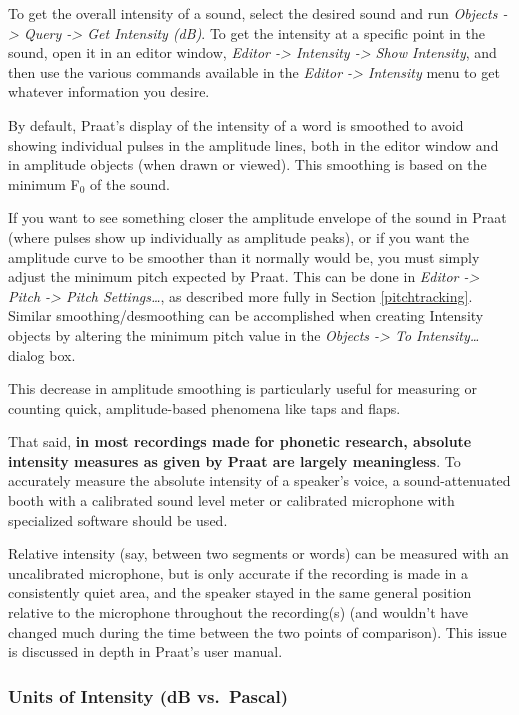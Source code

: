 \documentclass[11pt]{article}
\begin{document}
To get the overall intensity of a sound, select the desired sound and
run \emph{Objects -\textgreater{} Query -\textgreater{} Get Intensity
(dB)}. To get the intensity at a specific point in the sound, open it in
an editor window, \emph{Editor -\textgreater{} Intensity -\textgreater{}
Show Intensity}, and then use the various commands available in the
\emph{Editor -\textgreater{} Intensity} menu to get whatever information
you desire.

By default, Praat's display of the intensity of a word is smoothed to
avoid showing individual pulses in the amplitude lines, both in the
editor window and in amplitude objects (when drawn or viewed). This
smoothing is based on the minimum F$_{0}$ of the sound.

If you want to see something closer the amplitude envelope of the sound
in Praat (where pulses show up individually as amplitude peaks), or if
you want the amplitude curve to be smoother than it normally would be,
you must simply adjust the minimum pitch expected by Praat. This can be
done in \emph{Editor -\textgreater{} Pitch -\textgreater{} Pitch
Settings\ldots{}}, as described more fully in Section
\ref{pitchtracking}. Similar smoothing/desmoothing can be accomplished
when creating Intensity objects by altering the minimum pitch value in
the \emph{Objects -\textgreater{} To Intensity\ldots{}} dialog box.

This decrease in amplitude smoothing is particularly useful for
measuring or counting quick, amplitude-based phenomena like taps and
flaps.

That said, \textbf{in most recordings made for phonetic research,
absolute intensity measures as given by Praat are largely meaningless}.
To accurately measure the absolute intensity of a speaker's voice, a
sound-attenuated booth with a calibrated sound level meter or calibrated
microphone with specialized software should be used.

Relative intensity (say, between two segments or words) can be measured
with an uncalibrated microphone, but is only accurate if the recording
is made in a consistently quiet area, and the speaker stayed in the same
general position relative to the microphone throughout the recording(s)
(and wouldn't have changed much during the time between the two points
of comparison). This issue is discussed in depth in Praat's user manual.

\hypertarget{units-of-intensity-db-vs.-pascal}{%
\subsubsection{Units of Intensity (dB
vs.~Pascal)}\label{units-of-intensity-db-vs.-pascal}}
\end{document}

